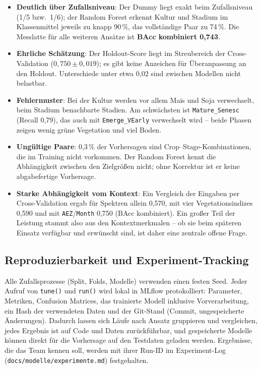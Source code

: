 \documentclass[11pt,a4paper]{article}
\begin{document}
\begin{itemize}
  \item \textbf{Deutlich über Zufallsniveau}: Der Dummy liegt exakt beim Zufallsniveau
        (1/5 bzw.\ 1/6); der Random Forest erkennt Kultur und Stadium im Klassenmittel jeweils
        zu knapp 90\,\%, das vollständige Paar zu 74\,\%. Die Messlatte für alle weiteren
        Ansätze ist \textbf{BAcc kombiniert 0,743}.
  \item \textbf{Ehrliche Schätzung}: Der Holdout-Score liegt im Streubereich der
        Cross-Validation ($0{,}750 \pm 0{,}019$); es gibt keine Anzeichen für Überanpassung
        an den Holdout. Unterschiede unter etwa 0,02 sind zwischen Modellen nicht belastbar.
  \item \textbf{Fehlermuster}: Bei der Kultur werden vor allem Mais und Soja verwechselt, beim
        Stadium benachbarte Stadien. Am schwächsten ist \texttt{Mature\_Senesc} (Recall 0,79),
        das auch mit \texttt{Emerge\_VEarly} verwechselt wird -- beide Phasen zeigen wenig grüne
        Vegetation und viel Boden.
  \item \textbf{Ungültige Paare}: 0,3\,\% der Vorhersagen sind Crop--Stage-Kombinationen, die im
        Training nicht vorkommen. Der Random Forest kennt die Abhängigkeit zwischen den
        Zielgrößen nicht; ohne Korrektur ist er keine abgabefertige Vorhersage.
  \item \textbf{Starke Abhängigkeit vom Kontext}: Ein Vergleich der Eingaben per
        Cross-Validation ergab für Spektren allein 0,570, mit vier Vegetationsindizes 0,590 und
        mit \texttt{AEZ}/\texttt{Month} 0,750 (BAcc kombiniert). Ein großer Teil der Leistung
        stammt also aus den Kontextmerkmalen -- ob sie beim späteren Einsatz verfügbar und
        erwünscht sind, ist daher eine zentrale offene Frage.
\end{itemize}

\subsection{Reproduzierbarkeit und Experiment-Tracking}
\label{sec:tracking}

Alle Zufallsprozesse (Split, Folds, Modelle) verwenden einen festen Seed. Jeder Aufruf von
\texttt{tune()} und \texttt{run()} wird lokal in MLflow protokolliert: Parameter, Metriken,
Confusion Matrices, das trainierte Modell inklusive Vorverarbeitung, ein Hash der verwendeten
Daten und der Git-Stand (Commit, ungespeicherte Änderungen). Dadurch lassen sich Läufe nach
Ansatz gruppieren und vergleichen, jedes Ergebnis ist auf Code und Daten zurückführbar, und
gespeicherte Modelle können direkt für die Vorhersage auf den Testdaten geladen werden.
Ergebnisse, die das Team kennen soll, werden mit ihrer Run-ID im Experiment-Log
(\texttt{docs/modelle/experimente.md}) festgehalten.
\end{document}
